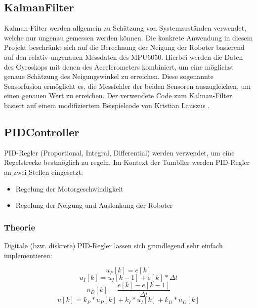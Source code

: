 \subsection{KalmanFilter}
Kalman-Filter werden allgemein zu Schätzung von Systemzuständen verwendet,
welche nur ungenau gemessen werden können.
%
Die konkrete Anwendung in diesem Projekt beschränkt sich auf die Berechnung
der Neigung der Roboter basierend auf den relativ ungenauen Messdaten des MPU6050.
%
Hierbei werden die Daten des Gyroskops mit denen des Accelerometers kombiniert,
um eine möglichst genaue Schätzung des Neigungswinkel zu erreichen\cite{digikey-kalman}.
%
Diese sogenannte Sensorfusion ermöglicht es,
die Messfehler der beiden Sensoren auszugleichen,
um einen genauen Wert zu erreichen.
%
Der verwendete Code zum Kalman-Filter basiert auf einem modifiziertem Beispielcode von Kristian Lauszus \cite{lauszus}.

\subsection{PIDController}
PID-Regler (Proportional, Integral, Differential) werden verwendet,
um eine Regelstrecke bestmöglich zu regeln.
%
Im Kontext der Tumbller werden PID-Regler an zwei Stellen eingesetzt:
\begin{itemize}
    \item Regelung der Motorgeschwindigkeit
    \item Regelung der Neigung und Auslenkung der Roboter
\end{itemize}

\subsubsection{Theorie}
Digitale (bzw. diskrete) PID-Regler lassen sich grundlegend sehr einfach implementieren:

\begin{equation}
    u_P[k] = e[k]
\end{equation}
\begin{equation}
    u_I[k] = u_I[k-1] + e[k] * \Delta t
\end{equation}
\begin{equation}
    u_D[k] = \frac{e[k] - e[k-1]}{\Delta t}
\end{equation}
\begin{equation}
    u[k] = k_P * u_P[k] + k_I * u_I[k] + k_D * u_D[k]
\end{equation}


